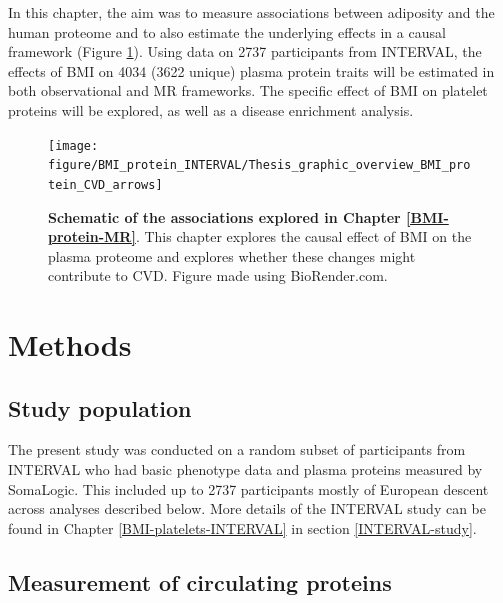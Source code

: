 \documentclass[11pt,twoside]{bristolthesis}
\begin{document}
In this chapter, the aim was to measure associations between adiposity and the human proteome and to also estimate the underlying effects in a causal framework (Figure \ref{fig:BMI-protein-graphic-INT}). Using data on 2737 participants from INTERVAL, the effects of BMI on 4034 (3622 unique) plasma protein traits will be estimated in both observational and MR frameworks. The specific effect of BMI on platelet proteins will be explored, as well as a disease enrichment analysis.



\begin{figure}

{\centering \texttt{[image: figure/BMI\_protein\_INTERVAL/Thesis\_graphic\_overview\_BMI\_protein\_CVD\_arrows]} 

}

\caption[Schematic of the associations explored in \ref{BMI-protein-MR}.]{\textbf{Schematic of the associations explored in Chapter \ref{BMI-protein-MR}}. This chapter explores the causal effect of BMI on the plasma proteome and explores whether these changes might contribute to CVD. Figure made using BioRender.com.}\label{fig:BMI-protein-graphic-INT}
\end{figure}
\hypertarget{methods-2}{%
\section{Methods}\label{methods-2}}

\hypertarget{study-population-2}{%
\subsection{Study population}\label{study-population-2}}

The present study was conducted on a random subset of participants from INTERVAL who had basic phenotype data and plasma proteins measured by SomaLogic. This included up to 2737 participants mostly of European descent across analyses described below. More details of the INTERVAL study can be found in Chapter \ref{BMI-platelets-INTERVAL} in section \ref{INTERVAL-study}.

\hypertarget{measurement-of-circulating-proteins}{%
\subsection{Measurement of circulating proteins}\label{measurement-of-circulating-proteins}}
\end{document}
